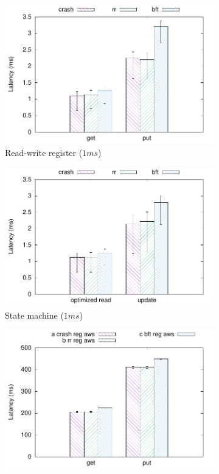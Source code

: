 \begin{figure}[th!]
    \centering
    \begin{subfigure}[t]{0.24 * 10cm}
        \includegraphics[width=\linewidth]{teem_results/protocol/1ms/lat/1ms_reg}
        \caption{Read-write register ($1ms$)}\label{fig:1ms_reg_lat}
    \end{subfigure}
    \begin{subfigure}[t]{0.24 * 10cm}
        \includegraphics[width=\linewidth]{teem_results/protocol/1ms/lat/1ms_smr}
        \caption{State machine ($1ms$)}\label{fig:1ms_smr_lat}
    \end{subfigure}
    \begin{subfigure}[t]{0.24 * 10cm}
        \includegraphics[width=\linewidth]{teem_results/protocol/aws/aws_reg}

\end{subfigure}
\end{figure}
